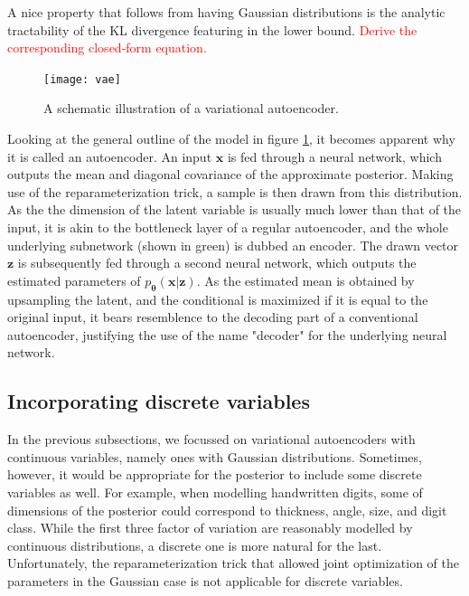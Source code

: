 \documentclass{report}
\newcommand\todo[1]{\textcolor{red}{#1}}
\begin{document}
\noindent A nice property that follows from having Gaussian distributions is the analytic tractability of the KL divergence featuring in the lower bound. \todo{Derive the corresponding closed-form equation.} \\

\begin{figure}
\begin{center}
\texttt{[image: vae]}
\caption{A schematic illustration of a variational autoencoder.}
\label{fig:vae}
\end{center}
\end{figure}

\noindent Looking at the general outline of the model in figure \ref{fig:vae}, it becomes apparent why it is called an autoencoder. An input $\boldsymbol{x}$ is fed through a neural network, which outputs the mean and diagonal covariance of the approximate posterior. Making use of the reparameterization trick, a sample is then drawn from this distribution. As the the dimension of the latent variable is usually much lower than that of the input, it is akin to the bottleneck layer of a regular autoencoder, and the whole underlying subnetwork (shown in green) is dubbed an encoder. The drawn vector $\boldsymbol{z}$ is subsequently fed through a second neural network, which outputs the estimated parameters of $p_{\boldsymbol{\theta}}(\boldsymbol{x}|\boldsymbol{z})$. As the estimated mean is obtained by upsampling the latent, and the conditional is maximized if it is equal to the original input, it bears resemblence to the decoding part of a conventional autoencoder, justifying the use of the name "decoder" for the underlying neural network.

\subsection{Incorporating discrete variables}

In the previous subsections, we focussed on variational autoencoders with continuous variables, namely ones with Gaussian distributions. Sometimes, however, it would be appropriate for the posterior to include some discrete variables as well. For example, when modelling handwritten digits, some of dimensions of the posterior could correspond to thickness, angle, size, and digit class. While the first three factor of variation are reasonably modelled by continuous distributions, a discrete one is more natural for the last. Unfortunately, the reparameterization trick that allowed joint optimization of the parameters in the Gaussian case is not applicable for discrete variables. \\
\end{document}
